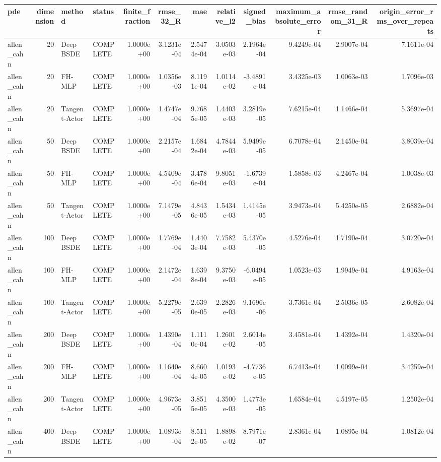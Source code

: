 \begin{tabular}{lrllrrrrrrrr}
\toprule
pde & dimension & method & status & finite\_fraction & rmse\_32\_R & mae & relative\_l2 & signed\_bias & maximum\_absolute\_error & rmse\_random\_31\_R & origin\_error\_rms\_over\_repeats \\
\midrule
allen\_cahn & 20 & Deep BSDE & COMPLETE & 1.0000e+00 & 3.1231e-04 & 2.5474e-04 & 3.0503e-03 & 2.1964e-04 & 9.4249e-04 & 2.9007e-04 & 7.1611e-04 \\
allen\_cahn & 20 & FH-MLP & COMPLETE & 1.0000e+00 & 1.0356e-03 & 8.1191e-04 & 1.0114e-02 & -3.4891e-04 & 3.4325e-03 & 1.0063e-03 & 1.7096e-03 \\
allen\_cahn & 20 & Tangent-Actor & COMPLETE & 1.0000e+00 & 1.4747e-04 & 9.7685e-05 & 1.4403e-03 & 3.2819e-05 & 7.6215e-04 & 1.1466e-04 & 5.3697e-04 \\
allen\_cahn & 50 & Deep BSDE & COMPLETE & 1.0000e+00 & 2.2157e-04 & 1.6842e-04 & 4.7844e-03 & 5.9499e-05 & 6.7078e-04 & 2.1450e-04 & 3.8039e-04 \\
allen\_cahn & 50 & FH-MLP & COMPLETE & 1.0000e+00 & 4.5409e-04 & 3.4786e-04 & 9.8051e-03 & -1.6739e-04 & 1.5858e-03 & 4.2467e-04 & 1.0038e-03 \\
allen\_cahn & 50 & Tangent-Actor & COMPLETE & 1.0000e+00 & 7.1479e-05 & 4.8436e-05 & 1.5434e-03 & 1.4145e-05 & 3.9473e-04 & 5.4250e-05 & 2.6882e-04 \\
allen\_cahn & 100 & Deep BSDE & COMPLETE & 1.0000e+00 & 1.7769e-04 & 1.4403e-04 & 7.7582e-03 & 5.4370e-05 & 4.5276e-04 & 1.7190e-04 & 3.0720e-04 \\
allen\_cahn & 100 & FH-MLP & COMPLETE & 1.0000e+00 & 2.1472e-04 & 1.6398e-04 & 9.3750e-03 & -6.0494e-05 & 1.0523e-03 & 1.9949e-04 & 4.9163e-04 \\
allen\_cahn & 100 & Tangent-Actor & COMPLETE & 1.0000e+00 & 5.2279e-05 & 2.6390e-05 & 2.2826e-03 & 9.1696e-06 & 3.7361e-04 & 2.5036e-05 & 2.6082e-04 \\
allen\_cahn & 200 & Deep BSDE & COMPLETE & 1.0000e+00 & 1.4390e-04 & 1.1110e-04 & 1.2601e-02 & 2.6014e-05 & 3.4581e-04 & 1.4392e-04 & 1.4320e-04 \\
allen\_cahn & 200 & FH-MLP & COMPLETE & 1.0000e+00 & 1.1640e-04 & 8.6604e-05 & 1.0193e-02 & -4.7736e-05 & 6.7413e-04 & 1.0099e-04 & 3.4259e-04 \\
allen\_cahn & 200 & Tangent-Actor & COMPLETE & 1.0000e+00 & 4.9673e-05 & 3.8515e-05 & 4.3500e-03 & 1.4773e-05 & 1.6584e-04 & 4.5197e-05 & 1.2502e-04 \\
allen\_cahn & 400 & Deep BSDE & COMPLETE & 1.0000e+00 & 1.0893e-04 & 8.5112e-05 & 1.8898e-02 & 8.7971e-07 & 2.8361e-04 & 1.0895e-04 & 1.0812e-04 \\

\end{tabular}
